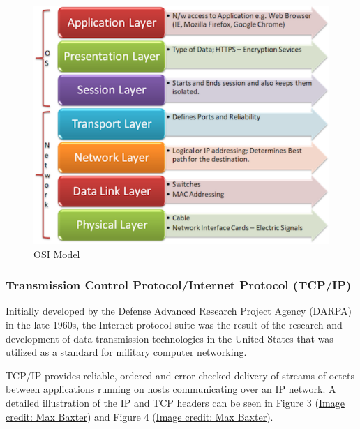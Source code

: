 \documentclass[11pt,]{article}
\begin{document}
\begin{figure}[h]

{\centering \includegraphics{thesis_files/figure-latex/unnamed-chunk-5-1} 

}

\caption{OSI Model}\label{fig:unnamed-chunk-5}
\end{figure}

\subsubsection{Transmission Control Protocol/Internet Protocol
(TCP/IP)}\label{transmission-control-protocolinternet-protocol-tcpip}

Initially developed by the Defense Advanced Research Project Agency
(DARPA) in the late 1960s, the Internet protocol suite was the result of
the research and development of data transmission technologies in the
United States that was utilized as a standard for military computer
networking.

TCP/IP provides reliable, ordered and error-checked delivery of streams
of octets between applications running on hosts communicating over an IP
network. A detailed illustration of the IP and TCP headers can be seen
in Figure 3 (\href{http://nmap.org/book/images/hdr/MJB-TCP-Header}{Image
credit: Max Baxter}) and Figure 4
(\href{http://nmap.org/book/images/hdr/MJB-IP-Header}{Image credit: Max
Baxter}).
\end{document}
